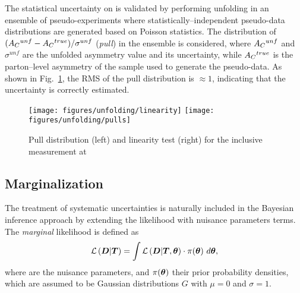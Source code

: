 The statistical uncertainty on \ac{} is validated by performing unfolding in
an ensemble of pseudo-experiments where statistically--independent
pseudo-data distributions are generated based on Poisson statistics.  
The distribution of $(A_C{}^{unf}-A_C{}^{true})/\sigma^{unf}$
({\it pull}) in the ensemble is considered, where $A_C{}^{unf}$ and
$\sigma^{unf}$ are the unfolded asymmetry value and its uncertainty,
while $A_C{}^{true}$ is the parton--level asymmetry of the sample used
to generate the pseudo-data. As shown in Fig.~\ref{fig:pulllinearity}, the
RMS of the pull distribution is $\approx{}1$, indicating that the
uncertainty is correctly estimated.

\begin{figure}[!htb]\centering
  \texttt{[image: figures/unfolding/linearity]}
  \texttt{[image: figures/unfolding/pulls]}
  \caption{Pull distribution (left) and linearity test (right) for the
    inclusive \ac{} measurement at \eighttev{}}
  \label{fig:pulllinearity}
\end{figure}

\subsection{Marginalization}
\label{sec:marginalization}

The treatment of systematic uncertainties is naturally included in the
Bayesian inference approach by extending the likelihood
\conditionalLhood{\Data{}}{\Truth{}} with nuisance parameters terms.
The {\it marginal} likelihood is defined as
\begin{equation}
  \mathcal{L}\left(\boldsymbol{D}{}|\boldsymbol{T}{}\right)=
  \int
  \mathcal{L}\left(\boldsymbol{D}{}|\boldsymbol{T}{},\boldsymbol{\theta}{}\right) 
  \cdot{} \pi{}(\boldsymbol{\theta}{})
  ~d\boldsymbol{\theta}{},
\end{equation}
where \thetavec{} are the nuisance parameters, and
$\pi{}(\boldsymbol{\theta}{})$ their prior probability densities, which are
assumed to be Gaussian distributions $G$ with $\mu=0$ and $\sigma=1$.

